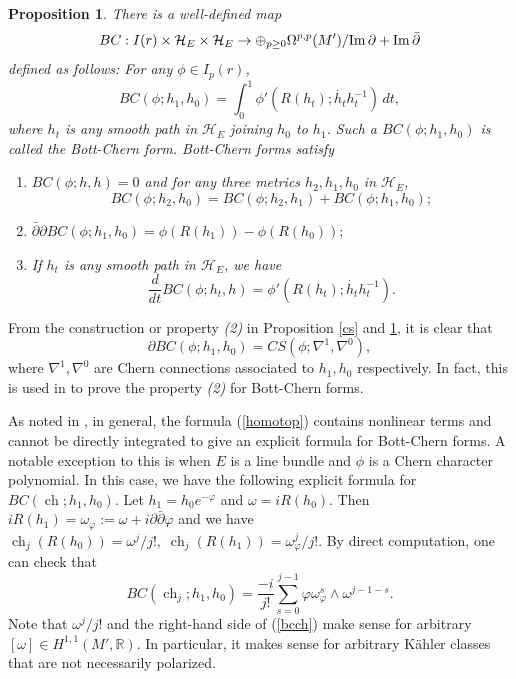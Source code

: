 \documentclass[12pt,reqno,a4paper]{amsart}
\numberwithin{equation}{section}
\def\p{\partial}
\def\bp{\bar\partial}
\DeclareMathOperator{\ch}{ch}
\def\Im{{\rm Im\,}}
\newtheorem{prop}[theo]{{\sc Proposition}}
\theoremstyle{remark}
\theoremstyle{dotless}
\begin{document}
\begin{prop}\label{bc}
There is a well-defined map
\begin{equation*}
BC : I(r)\times \mathcal{H}_E \times \mathcal{H}_E \rightarrow \oplus_{p\geq0}\Omega^{p,p}(M')/\Im \p + \Im \bp
\end{equation*}
defined as follows: For any $\phi\in I_p(r)$,
\begin{equation}\label{homotop}
BC(\phi;h_1,h_0)=\int_0^1 \phi'(R(h_t);\dot{h_t}h_t^{-1})\,dt,
\end{equation}
where $h_t$ is any smooth path in $\mathcal{H}_E$ joining $h_0$ to $h_1$. Such a $BC(\phi;h_1,h_0)$ is called the Bott-Chern form. Bott-Chern forms satisfy
\begin{enumerate}
    \item $BC(\phi;h,h)=0$ and for any three metrics $h_2, h_1, h_0$ in $\mathcal{H}_E$, 
    \begin{equation*}
BC(\phi;h_2,h_0)=BC(\phi;h_2,h_1)+BC(\phi;h_1,h_0) ;
    \end{equation*}
    \item $\bp\p BC(\phi;h_1,h_0)=\phi(R(h_1))-\phi(R(h_0)) ;$
    \item If $h_t$ is any smooth path in $\mathcal{H}_E$, we have
    \begin{equation*}
\frac{d}{dt}BC(\phi;h_t,h)=\phi'(R(h_t);\dot{h_t}h_t^{-1}).
    \end{equation*}
\end{enumerate}
\end{prop}

From the construction or property \textit{(2)} in Proposition \ref{cs} and \ref{bc}, it is clear that 
\begin{equation}\label{bccs}
\p BC(\phi;h_1,h_0)=CS(\phi;\nabla^1,\nabla^0),
\end{equation}
where $\nabla^1,\nabla^0$ are Chern connections associated to $h_1, h_0$ respectively. In fact, this is used in \cite[Proposition 3.15]{BC} to prove the property \textit{(2)} for Bott-Chern forms.

As noted in \cite[p84]{BC}, in general, the formula (\ref{homotop}) contains nonlinear terms and cannot be directly integrated to give an explicit formula for Bott-Chern forms. A notable exception to this is when $E$ is a line bundle and $\phi$ is a Chern character polynomial. In this case, we have the following explicit formula for $BC(\ch;h_1,h_0)$. Let $h_1=h_0e^{-\varphi}$ and $\omega=iR(h_0)$. Then $iR(h_1)=\omega_{\varphi}:=\omega+i\p\bp\varphi$ and we have $\ch_j(R(h_0))=\omega^j/j!,\; \ch_j(R(h_1))=\omega_{\varphi}^j/j!$. By direct computation, one can check that
\begin{equation}\label{bcch}
BC(\ch_j;h_1,h_0)=\frac{-i}{j!}\sum^{j-1}_{s=0}\varphi \omega_{\varphi}^s\wedge \omega^{j-1-s}.
\end{equation}
Note that $\omega^j/j!$ and the right-hand side of (\ref{bcch}) make sense for arbitrary $[\omega]\in H^{1,1}(M',\mathbb{R})$. In particular, it makes sense for arbitrary K\"ahler classes that are not necessarily polarized.
\end{document}
